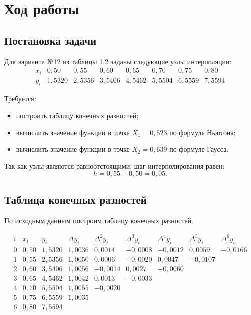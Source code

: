\documentclass[12pt]{report}
\begin{document}
	\section*{Ход работы}
	
	\subsection*{Постановка задачи}
	
	Для варианта №12 из таблицы 1.2 заданы следующие узлы интерполяции:
	\[
	\begin{array}{c|ccccccc}
		x_i & 0{,}50 & 0{,}55 & 0{,}60 & 0{,}65 & 0{,}70 & 0{,}75 & 0{,}80 \\
		\hline
		y_i & 1{,}5320 & 2{,}5356 & 3{,}5406 & 4{,}5462 & 5{,}5504 & 6{,}5559 & 7{,}5594
	\end{array}
	\]
	
	Требуется:
	\begin{itemize}
		\item построить таблицу конечных разностей;
		\item вычислить значение функции в точке \(X_1 = 0{,}523\) по формуле Ньютона;
		\item вычислить значение функции в точке \(X_2 = 0{,}639\) по формуле Гаусса.
	\end{itemize}
	
	Так как узлы являются равноотстоящими, шаг интерполирования равен:
	\[
	h = 0{,}55 - 0{,}50 = 0{,}05.
	\]
	
	\subsection*{Таблица конечных разностей}
	
	По исходным данным построим таблицу конечных разностей.
	
	\[
	\begin{array}{c|c|c|c|c|c|c|c|c}
		i & x_i & y_i & \Delta y_i & \Delta^2 y_i & \Delta^3 y_i & \Delta^4 y_i & \Delta^5 y_i & \Delta^6 y_i \\
		\hline
		0 & 0{,}50 & 1{,}5320 & 1{,}0036 & 0{,}0014 & -0{,}0008 & -0{,}0012 & 0{,}0059 & -0{,}0166 \\
		1 & 0{,}55 & 2{,}5356 & 1{,}0050 & 0{,}0006 & -0{,}0020 & 0{,}0047 & -0{,}0107 & \\
		2 & 0{,}60 & 3{,}5406 & 1{,}0056 & -0{,}0014 & 0{,}0027 & -0{,}0060 & & \\
		3 & 0{,}65 & 4{,}5462 & 1{,}0042 & 0{,}0013 & -0{,}0033 & & & \\
		4 & 0{,}70 & 5{,}5504 & 1{,}0055 & -0{,}0020 & & & & \\
		5 & 0{,}75 & 6{,}5559 & 1{,}0035 & & & & & \\
		6 & 0{,}80 & 7{,}5594 & & & & & &
	\end{array}
	\]
	
\end{document}
